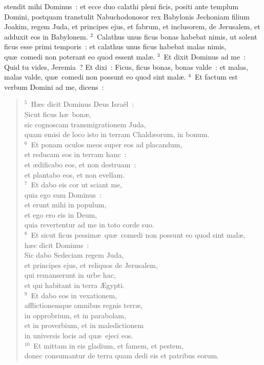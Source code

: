 \bchapter
{}stendit mihi Dominus~: et ecce duo calathi pleni ficis, positi ante templum Domini, postquam transtulit Nabuchodonosor rex Babylonis Jechoniam filium Joakim, regem Juda, et principes ejus, et fabrum, et inclusorem, de Jerusalem, et adduxit eos in Babylonem.
${}^{2}$~Calathus unus ficus bonas habebat nimis, ut solent ficus esse primi temporis~: et calathus unus ficus habebat malas nimis, qu\ae\ comedi non poterant eo quod essent mal\ae .
${}^{3}$~Et dixit Dominus ad me~: Quid tu vides, Jeremia~? Et dixi~: Ficus, ficus bonas, bonas valde~: et malas, malas valde, qu\ae\ comedi non possunt eo quod sint mal\ae .
${}^{4}$~Et factum est verbum Domini ad me, dicens~:
\begin{verse}${}^{5}$~H\ae c dicit Dominus Deus Isra\"el~:\\ Sicut ficus h\ae\ bon\ae ,\\ sic cognoscam transmigrationem Juda,\\ quam emisi de loco isto in terram Chald\ae orum, in bonum.\\
${}^{6}$~Et ponam oculos meos super eos ad placandum,\\ et reducam eos in terram hanc~:\\ et \ae dificabo eos, et non destruam~:\\ et plantabo eos, et non evellam.\\
${}^{7}$~Et dabo eis cor ut sciant me,\\ quia ego sum Dominus~:\\ et erunt mihi in populum,\\ et ego ero eis in Deum,\\ quia revertentur ad me in toto corde suo.\\
${}^{8}$~Et sicut ficus pessim\ae\ qu\ae\ comedi non possunt eo quod sint mal\ae ,\\ h\ae c dicit Dominus~:\\ Sic dabo Sedeciam regem Juda,\\ et principes ejus, et reliquos de Jerusalem,\\ qui remanserunt in urbe hac,\\ et qui habitant in terra \AE gypti.\\
${}^{9}$~Et dabo eos in vexationem,\\ afflictionemque omnibus regnis terr\ae ,\\ in opprobrium, et in parabolam,\\ et in proverbium, et in maledictionem\\ in universis locis ad qu\ae\ ejeci eos.\\
${}^{10}$~Et mittam in eis gladium, et famem, et pestem,\\ donec consumantur de terra quam dedi eis et patribus eorum.\end{verse}



